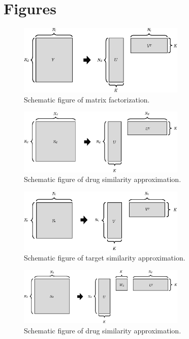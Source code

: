 \documentclass{article}
\begin{document}
\section{Figures}

\begin{figure} [htbp]
\centering
\includegraphics[width=8cm]{fig_tmf_matrix_new}
\caption{Schematic figure of matrix factorization.}\label{fig_tmf_matrix}
\end{figure}

\begin{figure} [htbp]
\centering
\includegraphics[width=8cm]{fig_cmf_sim_drug}
\caption{Schematic figure of drug similarity approximation.}\label{fig_cmf_sim_drug}
\end{figure}

\begin{figure} [htbp]
\centering
\includegraphics[width=8cm]{fig_cmf_sim_target}
\caption{Schematic figure of target similarity approximation.}\label{fig_cmf_sim_target}
\end{figure}

\begin{figure} [htbp]
\centering
\includegraphics[width=8cm]{fig_tmf_sim_drug_new}
\caption{Schematic figure of drug similarity approximation.}\label{fig_tmf_sim_drug}
\end{figure}
\end{document}
